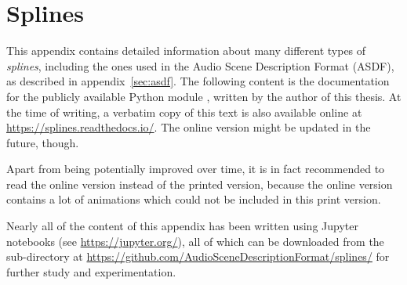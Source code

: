 \chapter{Splines}
\label{sec:splines}

This appendix contains detailed information
about many different types of \emph{splines},
including the ones used in the Audio Scene Description Format (ASDF),
as described in appendix~\ref{sec:asdf}.
The following content is the documentation for the
publicly available Python module ,
written by the author of this thesis.
At the time of writing,
a verbatim copy of this text
is also available online at
\url{https://splines.readthedocs.io/}.
The online version might be updated in the future, though.

Apart from being potentially improved over time,
it is in fact recommended to read the online version
instead of the printed version, because the online version contains
a lot of animations which could not be included in this print version.

Nearly all of the content of this appendix has been written using
Jupyter notebooks (see \url{https://jupyter.org/}),
all of which can be downloaded from the sub-directory  at
\url{https://github.com/AudioSceneDescriptionFormat/splines/}
for further study and experimentation.


